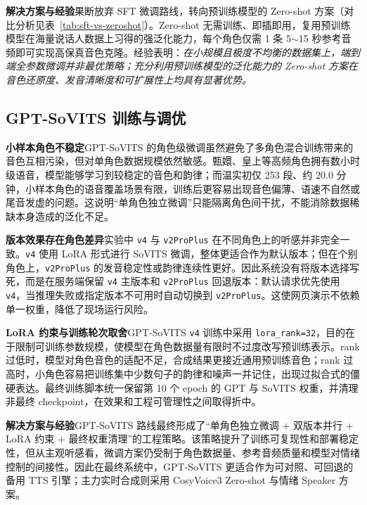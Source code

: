 \documentclass[12pt,a4paper]{article}
\begin{document}
\textbf{解决方案与经验}\quad 果断放弃 SFT 微调路线，转向预训练模型的 Zero-shot 方案（对比分析见表~\ref{tab:sft-vs-zeroshot}）。Zero-shot 无需训练、即插即用，复用预训练模型在海量说话人数据上习得的强泛化能力，每个角色仅需 1 条 5$\sim$15 秒参考音频即可实现高保真音色克隆。经验表明：\textit{在小规模且极度不均衡的数据集上，端到端全参数微调并非最优策略；充分利用预训练模型的泛化能力的 Zero-shot 方案在音色还原度、发音清晰度和可扩展性上均具有显著优势。}

\subsection{GPT-SoVITS 训练与调优}
\label{sec:prob-gptsovits}

\textbf{小样本角色不稳定}\quad GPT-SoVITS 的角色级微调虽然避免了多角色混合训练带来的音色互相污染，但对单角色数据规模依然敏感。甄嬛、皇上等高频角色拥有数小时级语音，模型能够学习到较稳定的音色和韵律；而温实初仅 253 段、约 20.0 分钟，小样本角色的语音覆盖场景有限，训练后更容易出现音色偏薄、语速不自然或尾音发虚的问题。这说明“单角色独立微调”只能隔离角色间干扰，不能消除数据稀缺本身造成的泛化不足。

\textbf{版本效果存在角色差异}\quad 实验中 \texttt{v4} 与 \texttt{v2ProPlus} 在不同角色上的听感并非完全一致。\texttt{v4} 使用 LoRA 形式进行 SoVITS 微调，整体更适合作为默认版本；但在个别角色上，\texttt{v2ProPlus} 的发音稳定性或韵律连续性更好。因此系统没有将版本选择写死，而是在服务端保留 \texttt{v4} 主版本和 \texttt{v2ProPlus} 回退版本：默认请求优先使用 \texttt{v4}，当推理失败或指定版本不可用时自动切换到 \texttt{v2ProPlus}。这使网页演示不依赖单一权重，降低了现场运行风险。

\textbf{LoRA 约束与训练轮次取舍}\quad GPT-SoVITS \texttt{v4} 训练中采用 \texttt{lora\_rank=32}，目的在于限制可训练参数规模，使模型在角色数据量有限时不过度改写预训练表示。rank 过低时，模型对角色音色的适配不足，合成结果更接近通用预训练音色；rank 过高时，小角色容易把训练集中少数句子的韵律和噪声一并记住，出现过拟合式的僵硬表达。最终训练脚本统一保留第 10 个 epoch 的 GPT 与 SoVITS 权重，并清理非最终 checkpoint，在效果和工程可管理性之间取得折中。

\textbf{解决方案与经验}\quad GPT-SoVITS 路线最终形成了“单角色独立微调 + 双版本并行 + LoRA 约束 + 最终权重清理”的工程策略。该策略提升了训练可复现性和部署稳定性，但从主观听感看，微调方案仍受制于角色数据量、参考音频质量和模型对情绪控制的间接性。因此在最终系统中，GPT-SoVITS 更适合作为可对照、可回退的备用 TTS 引擎；主力实时合成则采用 CosyVoice3 Zero-shot 与情绪 Speaker 方案。
\end{document}
